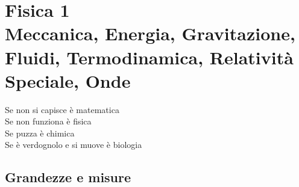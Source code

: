 \part[Fisica 1]{Fisica 1\\\vspace{1cm}\large{Meccanica, Energia, Gravitazione, Fluidi, Termodinamica, Relatività Speciale, Onde}}
\parttoc
\mtcskip


\begin{savequote}
  Se non si capisce è matematica\\
  Se non funziona è fisica\\
  Se puzza è chimica\\
  Se è verdognolo e si muove è biologia\\
\end{savequote}
\chapter{Grandezze e misure}
\minitoc
